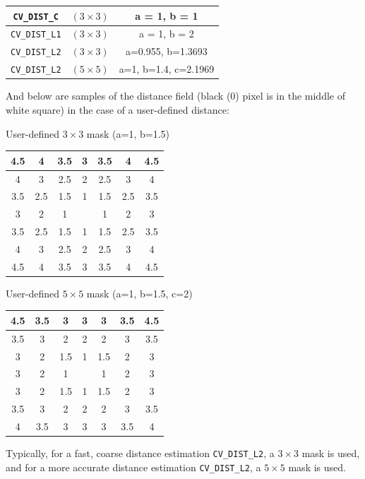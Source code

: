 \begin{tabular}{| c | c | c |}
\hline
\texttt{CV\_DIST\_C}  & $(3\times 3)$ & a = 1, b = 1\\ \hline
\texttt{CV\_DIST\_L1} & $(3\times 3)$ & a = 1, b = 2\\ \hline
\texttt{CV\_DIST\_L2} & $(3\times 3)$ & a=0.955, b=1.3693\\ \hline
\texttt{CV\_DIST\_L2} & $(5\times 5)$ & a=1, b=1.4, c=2.1969\\ \hline
\end{tabular}

And below are samples of the distance field (black (0) pixel is in the middle of white square) in the case of a user-defined distance:

User-defined $3 \times 3$ mask (a=1, b=1.5)

\begin{tabular}{| c | c | c | c | c | c | c |}
\hline
4.5 & 4 & 3.5 & 3 & 3.5 & 4 & 4.5\\ \hline
4 & 3 & 2.5 & 2 & 2.5 & 3 & 4\\ \hline
3.5 & 2.5 & 1.5 & 1 & 1.5 & 2.5 & 3.5\\ \hline
3 & 2 & 1 &     & 1 & 2 & 3\\ \hline
3.5 & 2.5 & 1.5 & 1 & 1.5 & 2.5 & 3.5\\ \hline
4 & 3 & 2.5 & 2 & 2.5 & 3 & 4\\ \hline
4.5 & 4 & 3.5 & 3 & 3.5 & 4 & 4.5\\ \hline
\end{tabular}

User-defined $5 \times 5$ mask (a=1, b=1.5, c=2)

\begin{tabular}{| c | c | c | c | c | c | c |}
\hline
4.5 & 3.5 & 3 & 3 & 3 & 3.5 & 4.5\\ \hline
3.5 & 3 & 2 & 2 & 2 & 3 & 3.5\\ \hline
3 & 2 & 1.5 & 1 & 1.5 & 2 & 3\\ \hline
3 & 2 & 1 & & 1 & 2 & 3\\ \hline
3 & 2 & 1.5 & 1 & 1.5 & 2 & 3\\ \hline
3.5 & 3 & 2 & 2 & 2 & 3 & 3.5\\ \hline
4 & 3.5 & 3 & 3 & 3 & 3.5 & 4\\ \hline
\end{tabular}


Typically, for a fast, coarse distance estimation \texttt{CV\_DIST\_L2},
a $3\times 3$ mask is used, and for a more accurate distance estimation
\texttt{CV\_DIST\_L2}, a $5\times 5$ mask is used.


